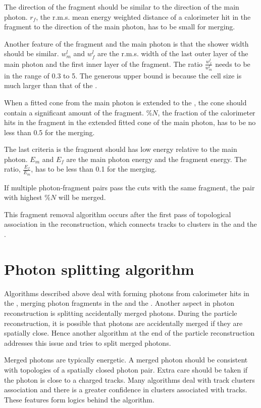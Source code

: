 The direction of the fragment should be similar to the direction of the main photon. $r_f$, the r.m.s. mean energy weighted distance of a calorimeter hit in the fragment to the direction of the main photon, has to be small for merging.

Another feature of the fragment and the main photon is that the shower width should be similar. $w^l_m$ and $w^l_f$ are the r.m.s. width of the last outer layer of the main photon and the first inner layer of the fragment. The ratio $\frac{w^l_f}{w^l_m}$ needs to be in the range of 0.3 to 5. The generous upper bound is because the \HCAL cell size is much larger than that of the \ECAL.

When a fitted cone from the main photon is extended to the \HCAL, the cone should contain a significant amount of the fragment. $\%{N}$, the fraction of the calorimeter hits in the fragment in the extended fitted cone of the main photon, has to be no less than 0.5 for the merging.

The last criteria is the fragment should has low energy relative to the main photon. $E_m$ and $E_f$ are the main photon energy and the fragment energy. The ratio, $\frac{E_f}{E_m}$, has to be less than 0.1 for the merging.

If multiple photon-fragment pairs pass the cuts with the same fragment, the pair with highest $\%{N}$ will be merged.

This \HCAL fragment removal algorithm occurs after the first pass of topological association in the reconstruction, which connects tracks to clusters in the \ECAL and the \HCAL.

\section{Photon splitting algorithm}
\label{sec:photonSplitting}

Algorithms described above deal with forming photons from calorimeter hits in the \ECAL, merging photon fragments in the \ECAL and the \HCAL. Another aspect in photon reconstruction is splitting accidentally merged photons. During the particle reconstruction, it is possible that photons are accidentally merged if they are spatially close. Hence another algorithm at the end of the particle reconstruction addresses this issue and tries to split merged photons.

Merged photons are typically energetic. A merged photon should be consistent with topologies of a spatially closed photon pair. Extra care should be taken if the photon is close to a charged tracks. Many \pandora algorithms deal with track clusters association and there is a greater confidence in clusters associated with tracks. These features form logics behind the algorithm.

